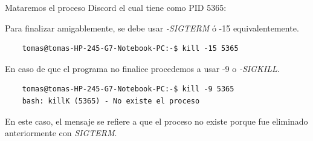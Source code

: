 \documentclass{article}
\begin{document}
\noindent
Mataremos el proceso Discord el cual tiene como PID 5365:

\medskip\noindent
Para finalizar amigablemente, se debe usar \textit{-SIGTERM} ó -15 equivalentemente.
    
\begin{commandline}
  \begin{verbatim}
    tomas@tomas-HP-245-G7-Notebook-PC:-$ kill -15 5365
  \end{verbatim}
\end{commandline}

\noindent
En caso de que el programa no finalice procedemos a usar -9 o \textit{-SIGKILL}.


\begin{commandline}
  \begin{verbatim}
    tomas@tomas-HP-245-G7-Notebook-PC:-$ kill -9 5365
    bash: killK (5365) - No existe el proceso
  \end{verbatim}
\end{commandline}

\noindent
En este caso, el mensaje se refiere a que el proceso no existe porque fue eliminado anteriormente con \textit{SIGTERM}.

\end{document}
